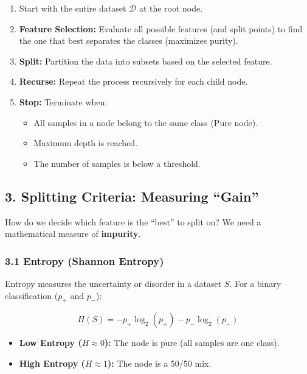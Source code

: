 \documentclass[
  italian,
  11pt,
]{article}
\begin{document}
\begin{enumerate}
\def\labelenumi{\arabic{enumi}.}
\item
  Start with the entire dataset \(\mathcal{D}\) at the root node.
\item
  \textbf{Feature Selection:} Evaluate all possible features (and split
  points) to find the one that best separates the classes (maximizes
  purity).
\item
  \textbf{Split:} Partition the data into subsets based on the selected
  feature.
\item
  \textbf{Recurse:} Repeat the process recursively for each child node.
\item
  \textbf{Stop:} Terminate when:

  \begin{itemize}
  \item
    All samples in a node belong to the same class (Pure node).
  \item
    Maximum depth is reached.
  \item
    The number of samples is below a threshold.
  \end{itemize}
\end{enumerate}

\subsection{3. Splitting Criteria: Measuring
``Gain''}\label{splitting-criteria-measuring-gain}

How do we decide which feature is the ``best'' to split on? We need a
mathematical measure of \textbf{impurity}.

\subsubsection{3.1 Entropy (Shannon
Entropy)}\label{entropy-shannon-entropy}

Entropy measures the uncertainty or disorder in a dataset \(S\). For a
binary classification (\(p_+\) and \(p_-\)):

\[H(S) = -p_+ \log_2(p_+) - p_- \log_2(p_-)\]

\begin{itemize}
\item
  \textbf{Low Entropy (\(H \approx 0\)):} The node is pure (all samples
  are one class).
\item
  \textbf{High Entropy (\(H \approx 1\)):} The node is a 50/50 mix.
\end{itemize}
\end{document}
